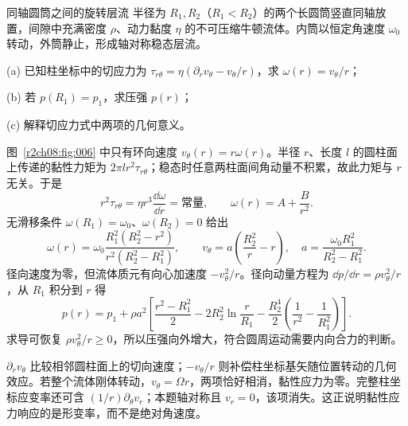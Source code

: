 \begin{practicebox}{同轴圆筒之间的旋转层流}
半径为 $R_1,R_2$（$R_1<R_2$）的两个长圆筒竖直同轴放置，间隙中充满密度 $\rho$、动力黏度 $\eta$ 的不可压缩牛顿流体。内筒以恒定角速度 $\omega_0$ 转动，外筒静止，形成轴对称稳态层流。

(a) 已知柱坐标中的切应力为 $\tau_{r\theta}=\eta(\partial_r v_\theta-v_\theta/r)$，求 $\omega(r)=v_\theta/r$；

(b) 若 $p(R_1)=p_1$，求压强 $p(r)$；

(c) 解释切应力式中两项的几何意义。
\label{r2ch08:pr:002}
\begin{solution}
图~\ref{r2ch08:fig:006} 中只有环向速度 $v_\theta(r)=r\omega(r)$。半径 $r$、长度 $l$ 的圆柱面上传递的黏性力矩为 $2\pi l r^2\tau_{r\theta}$；稳态时任意两柱面间角动量不积累，故此力矩与 $r$ 无关。于是
\begin{equation}
 r^2\tau_{r\theta}=\eta r^3\frac{\dd\omega}{\dd r}=\text{常量},
 \qquad \omega(r)=A+\frac B{r^2}.
 \label{r2ch08:eq:024}
\end{equation}
无滑移条件 $\omega(R_1)=\omega_0$、$\omega(R_2)=0$ 给出
\begin{equation}
 \boxed{\omega(r)=\omega_0\frac{R_1^2(R_2^2-r^2)}{r^2(R_2^2-R_1^2)}},
 \qquad
 v_\theta=a\left(\frac{R_2^2}{r}-r\right),
 \quad a=\frac{\omega_0R_1^2}{R_2^2-R_1^2}.
 \label{r2ch08:eq:025}
\end{equation}
径向速度为零，但流体质元有向心加速度 $-v_\theta^2/r$。径向动量方程为 $\dd p/\dd r=\rho v_\theta^2/r$，从 $R_1$ 积分到 $r$ 得
\begin{equation}
 \boxed{p(r)=p_1+\rho a^2\left[
 \frac{r^2-R_1^2}{2}-2R_2^2\ln\frac r{R_1}
 -\frac{R_2^4}{2}\left(\frac1{r^2}-\frac1{R_1^2}\right)
 \right]}.
 \label{r2ch08:eq:026}
\end{equation}
求导可恢复 $\rho v_\theta^2/r\ge0$，所以压强向外增大，符合圆周运动需要内向合力的判断。

$\partial_rv_\theta$ 比较相邻圆柱面上的切向速度；$-v_\theta/r$ 则补偿柱坐标基矢随位置转动的几何效应。若整个流体刚体转动，$v_\theta=\Omega r$，两项恰好相消，黏性应力为零。完整柱坐标应变率还可含 $(1/r)\partial_\theta v_r$；本题轴对称且 $v_r=0$，该项消失。这正说明黏性应力响应的是形变率，而不是绝对角速度。
\figCouette
\end{solution}
\end{practicebox}

